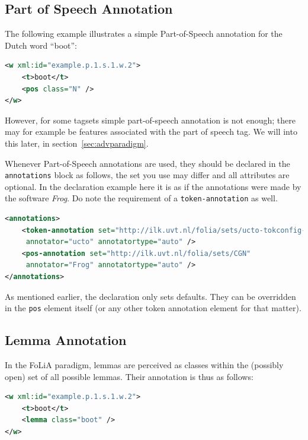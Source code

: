 \documentclass[a4paper,12pt]{report}
\begin{document}
\subsection{Part of Speech Annotation}

The following example illustrates a simple Part-of-Speech annotation for the Dutch word ``boot'':

\begin{lstlisting}[language=xml]
<w xml:id="example.p.1.s.1.w.2">
    <t>boot</t>
    <pos class="N" />
</w>
\end{lstlisting}



However, for some tagsets simple part-of-speech annotation is not enough; there may for example be features associated with the part of speech tag. We will into this later, in section~\ref{sec:advparadigm}.

Whenever Part-of-Speech annotations are used, they should be declared in the \texttt{annotations} block as follows, the set you use may differ and all attributes are optional. In the declaration example here it is as if the annotations were made by the software \emph{Frog}. Do note the requirement of a \texttt{token-annotation} as well.

\begin{lstlisting}[language=xml]
<annotations>
    <token-annotation set="http://ilk.uvt.nl/folia/sets/ucto-tokconfig-nl" 
     annotator="ucto" annotatortype="auto" />
    <pos-annotation set="http://ilk.uvt.nl/folia/sets/CGN" 
     annotator="Frog" annotatortype="auto" />
</annotations>
\end{lstlisting}

As mentioned earlier, the declaration only sets defaults. They can be overridden in the \texttt{pos} element itself (or any other token annotation element for that matter).

\subsection{Lemma Annotation}

In the FoLiA paradigm, lemmas are perceived as classes within the (possibly open) set of all possible lemmas. Their annotation is thus as follows:

\begin{lstlisting}[language=xml]
<w xml:id="example.p.1.s.1.w.2">
    <t>boot</t>
    <lemma class="boot" />
</w>
\end{lstlisting}
\end{document}

